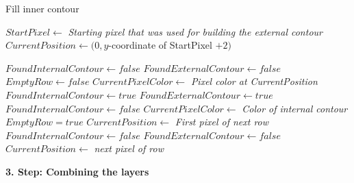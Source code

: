 \documentclass[thesis.tex]{subfiles}
\begin{document}
 \begin{algorithm}
   \caption{Fill inner contour}
\label{scan_pseudocode}
    \begin{algorithmic}[1]
      \State ${StartPixel\gets}$ \textit{Starting pixel that was used for building the external contour}
        \State ${CurrentPosition\gets} (0, y$-coordinate of StartPixel $+ 2)$

\State ${FoundInternalContour\gets false}$
\State ${FoundExternalContour\gets false}$
\State ${EmptyRow\gets false}$
\State
\State ${CurrentPixelColor \gets }$ \textit{Pixel color at CurrentPosition}
\State
					\State ${FoundInternalContour\gets true}$
				\State ${FoundExternalContour\gets true}$
				\State ${FoundInternalContour\gets false}$
				\Else
						\State ${CurrentPixelColor\gets}$ \textit{Color of internal contour}
					\EndIf
				\EndIf
\State
			\State ${EmptyRow = true}$
		\Else
			\State ${CurrentPosition \gets}$ \textit{First pixel of next row}
			\State ${FoundInternalContour\gets false}$
			\State ${FoundExternalContour\gets false}$
		\EndIf
		\Else
		\State ${CurrentPosition} \gets$ \textit{next pixel of row}
		\EndIf
        \EndWhile
      


\end{algorithmic}
\end{algorithm}

\textbf{3. Step: Combining the layers}
\end{document}
